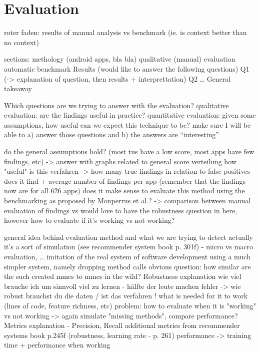 \chapter{Evaluation}\label{ch:eval}
roter faden: results of manual analysis vs benchmark (ie. is context better than no context)

sections:
    methology (android apps, bla bla)
        qualitative (manual) evaluation
        automatic benchmark
    Results (would like to answer the following questions)
        Q1 (-> explanation of question, then results + interprettation)
        Q2
        \ldots
    General takeaway

Which questions are we trying to answer with the evaluation?
    qualitative evaluation: are the findings useful in practice?
    quantitative evaluation: given some assumptions, how useful can we expect this technique to be?
    make sure I will be able to a) answer those questions and b) the answers are ``interesting''

    do the general assumptions hold? (most tus have a low score, most apps have few findings, etc)
        -> answer with graphs related to general score verteilung
	how "useful" is this verfahren -> how many true findings in relation to false positives does it find + average number of findings per app (remember that the findings now are for all 626 apps)
    does it make sense to evaluate this method using the benchmarking as proposed by Monperrus et al.?
        -> comparison between manual evaluation of findings vs 
    would love to have the robustness question in here, however how to evaluate if it's working vs not working?

general idea behind evaluation method and what we are trying to detect
actually it's a sort of simulation (see recommender system book p. 301f) - micro vs macro evaluation, \ldots
    imitation of the real system of software development
    using a much simpler system, namely dropping method calls
    obvious question: how similar are the such created mmcs to mmcs in the wild?
Robustness explanation
    wie viel brauche ich um sinnvoll viel zu lernen - hälfte der leute machen fehler -> wie robust brauchst du die daten / ist das verfahren !
    what is needed for it to work (lines of code, feature richness, etc) 
    problem: how to evaluate when it is "working" vs not working -> again simulate "missing methods", compare performance?
Metrics explanation - Precision, Recall
    additional metrics from recommender systems book p.245f (robustness, learning rate - p. 261)
    performance -> training time + performance when working


